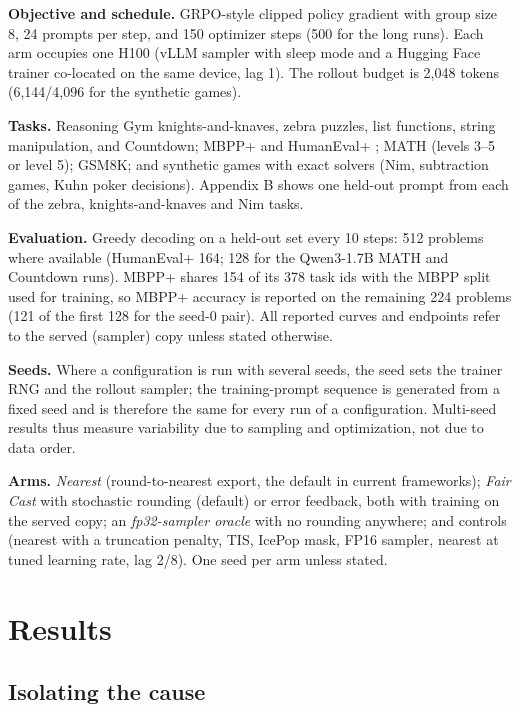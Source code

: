 \documentclass[
  10pt,
]{article}
\begin{document}
\textbf{Objective and schedule.} GRPO-style clipped policy gradient with group size 8, 24 prompts
per step, and 150 optimizer steps (500 for the long runs). Each arm occupies one H100 (vLLM sampler
with sleep mode and a Hugging Face trainer co-located on the same device, lag 1). The rollout budget
is 2,048 tokens (6,144/4,096 for the synthetic games).

\textbf{Tasks.} Reasoning Gym \cite{r17} knights-and-knaves, zebra puzzles, list functions, string
manipulation, and Countdown; MBPP+ and HumanEval+ \cite{r18}; MATH (levels 3--5 or level 5); GSM8K;
and synthetic games with exact solvers (Nim, subtraction games, Kuhn poker decisions). Appendix B
shows one held-out prompt from each of the zebra, knights-and-knaves and Nim tasks.

\textbf{Evaluation.} Greedy decoding on a held-out set every 10 steps: 512 problems where available
(HumanEval+ 164; 128 for the Qwen3-1.7B MATH and Countdown runs). MBPP+ shares 154 of its 378 task
ids with the MBPP split used for training, so MBPP+ accuracy is reported on the remaining 224
problems (121 of the first 128 for the seed-0 pair). All reported curves and endpoints refer to the
served (sampler) copy unless stated otherwise.

\textbf{Seeds.} Where a configuration is run with several seeds, the seed sets the trainer RNG and
the rollout sampler; the training-prompt sequence is generated from a fixed seed and is therefore
the same for every run of a configuration. Multi-seed results thus measure variability due to
sampling and optimization, not due to data order.

\textbf{Arms.} \emph{Nearest} (round-to-nearest export, the default in current frameworks);
\emph{Fair Cast} with stochastic rounding (default) or error feedback, both with training on the
served copy; an \emph{fp32-sampler oracle} with no rounding anywhere; and controls (nearest with a
truncation penalty, TIS, IcePop mask, FP16 sampler, nearest at tuned learning rate, lag 2/8). One
seed per arm unless stated.

\section{Results}\label{results}

\subsection{Isolating the cause}\label{isolating-the-cause}
\end{document}
